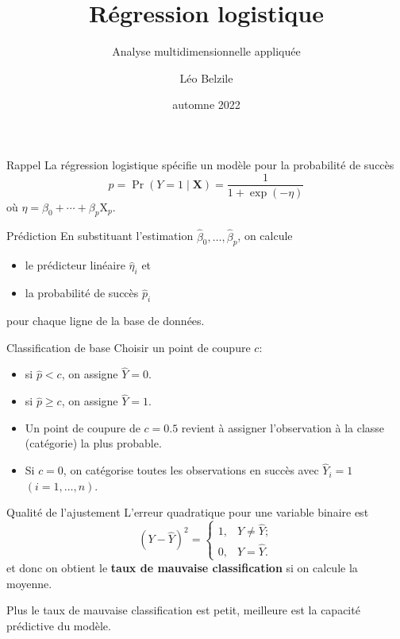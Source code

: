 \documentclass[
  ignorenonframetext,
]{beamer}
\title{Régression logistique}
\subtitle{Analyse multidimensionnelle appliquée}
\author{Léo Belzile}
\date{automne 2022}
\institute{HEC Montréal}
\providecommand{\tightlist}{%
  \setlength{\itemsep}{0pt}\setlength{\parskip}{0pt}}\usepackage{longtable,booktabs,array}
\begin{document}
\frame{\titlepage}
\ifdefined\Shaded\renewenvironment{Shaded}{\begin{tcolorbox}[breakable, frame hidden, sharp corners, boxrule=0pt, interior hidden, borderline west={3pt}{0pt}{shadecolor}, enhanced]}{\end{tcolorbox}}\fi

\begin{frame}{Rappel}
\protect\hypertarget{rappel}{}
La régression logistique spécifie un modèle pour la probabilité de
succès \[p = \Pr(Y=1 \mid \mathbf{X}) = \frac{1}{1+\exp(-\eta)}\] où
\(\eta = \beta_0 + \cdots + \beta_p \mathrm{X}_p\).
\end{frame}

\begin{frame}{Prédiction}
\protect\hypertarget{pruxe9diction}{}
En substituant l'estimation
\(\widehat{\beta}_0, \ldots, \widehat{\beta}_p\), on calcule

\begin{itemize}
\tightlist
\item
  le prédicteur linéaire \(\widehat{\eta}_i\) et
\item
  la probabilité de succès \(\widehat{p}_i\)
\end{itemize}

pour chaque ligne de la base de données.
\end{frame}

\begin{frame}{Classification de base}
\protect\hypertarget{classification-de-base}{}
Choisir un point de coupure \(c\):

\begin{itemize}
\item
  si \(\widehat{p} < c\), on assigne \(\widehat{Y}=0\).
\item
  si \(\widehat{p} \geq c\), on assigne \(\widehat{Y}=1\).
\item
  Un point de coupure de \(c=0.5\) revient à assigner l'observation à la
  classe (catégorie) la plus probable.
\item
  Si \(c=0\), on catégorise toutes les observations en succès avec
  \(\widehat{Y}_i=1\) \((i=1, \ldots, n)\).
\end{itemize}
\end{frame}

\begin{frame}{Qualité de l'ajustement}
\protect\hypertarget{qualituxe9-de-lajustement}{}
L'erreur quadratique pour une variable binaire est
\[(Y-\widehat{Y})^2 = \begin{cases} 1, & Y \neq \widehat{Y}; \\0, & Y = \widehat{Y}.\end{cases}\]
et donc on obtient le \textbf{taux de mauvaise classification} si on
calcule la moyenne.

Plus le taux de mauvaise classification est petit, meilleure est la
capacité prédictive du modèle.
\end{frame}
\end{document}
